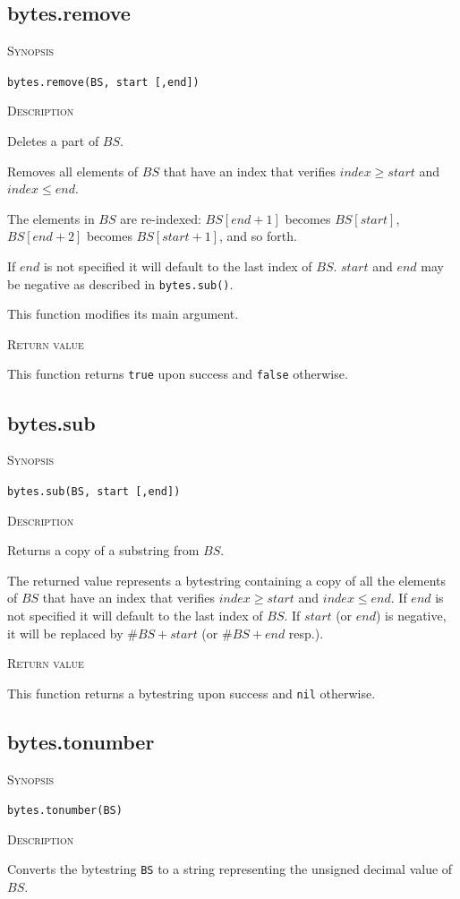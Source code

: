 \documentclass[11pt]{report}
\newcommand{\mansection}[1]{\vspace{0.5em}\par\noindent\textsc{#1}\vspace{0.5em}\par}
\begin{document}
\subsection{bytes.remove}

\mansection{Synopsis}
\texttt{bytes.remove(BS, start [,end])}

\mansection{Description}
  Deletes a part of $BS$.

  Removes all elements of $BS$ that have an index that verifies 
  $index \geq start$ and $index \leq end$.

  The elements in $BS$ are re-indexed: $BS[end+1]$ becomes $BS[start]$,
  $BS[end+2]$ becomes $BS[start+1]$, and so forth.

  If $end$ is not specified it will default to the last index of $BS$.
  $start$ and $end$ may be negative as described in \texttt{bytes.sub()}.

  This function modifies its main argument.
  
\mansection{Return value}
  This function returns \texttt{true} upon success and \texttt{false} otherwise.


\subsection{bytes.sub}

\mansection{Synopsis}
\texttt{bytes.sub(BS, start [,end])}

\mansection{Description}
  Returns a copy of a substring from $BS$.

  The returned value represents a bytestring containing a copy of all the 
  elements of $BS$ that have an index that verifies $index \geq start$ and 
  $index \leq end$.
  If $end$ is not specified it will default to the last index of $BS$.
  If $start$ (or $end$) is negative, it will be replaced by $\#BS+start$
  (or $\#BS+end$ resp.).

\mansection{Return value}
  This function returns a bytestring upon success and \texttt{nil} otherwise.


\subsection{bytes.tonumber}

\mansection{Synopsis}
\texttt{bytes.tonumber(BS)}

\mansection{Description}
  Converts the bytestring \texttt{BS} to a string representing the unsigned 
  decimal value of $BS$.
\end{document}

